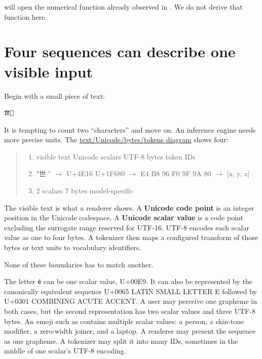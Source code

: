  will open the numerical function already observed in .
We do not derive that function here.

\section{Four sequences can describe one visible
input}\label{four-sequences-can-describe-one-visible-input}

Begin with a small piece of text:

\begin{verbatim}
世🚀
\end{verbatim}

It is tempting to count two ``characters'' and move on. An inference
engine needs more precise units. The
\href{https://github.com/hermonai/inside-the-llm-engine/blob/astra-visual-rewrite/diagrams/tokenizer/text-unicode-bytes-tokens.txt}{text/Unicode/bytes/tokens
diagram} shows four:

\begin{quote}
\begin{enumerate}
\item visible text       Unicode scalars       UTF-8 bytes           token IDs
\item "世🚀"          \(\longrightarrow\)   U+4E16 U+1F680    \(\longrightarrow\)   E4 B8 96 F0 9F 9A 80  \(\longrightarrow\)  [x, y, z]
\item 2 scalars                7 bytes            model-specific
\end{enumerate}
\end{quote}

The visible text is what a renderer shows. A \textbf{Unicode code point}
is an integer position in the Unicode codespace. A \textbf{Unicode
scalar value} is a code point excluding the surrogate range reserved for
UTF-16. UTF-8 encodes each scalar value as one to four bytes. A
tokenizer then maps a configured transform of those bytes or text units
to vocabulary identifiers.

None of these boundaries has to match another.

The letter \texttt{é} can be one scalar value, U+00E9. It can also be
represented by the canonically equivalent sequence U+0065 LATIN SMALL
LETTER E followed by U+0301 COMBINING ACUTE ACCENT. A user may perceive
one grapheme in both cases, but the second representation has two scalar
values and three UTF-8 bytes. An emoji such as
 contains multiple scalar values: a
person, a skin-tone modifier, a zero-width joiner, and a laptop. A
renderer may present the sequence as one grapheme. A tokenizer may split
it into many IDs, sometimes in the middle of one scalar's UTF-8
encoding.

